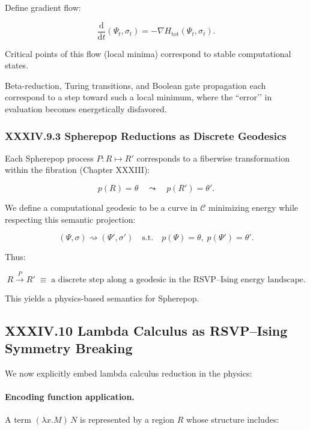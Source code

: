 \documentclass[11pt,letterpaper]{article}
\begin{document}
Define gradient flow:

\[
\frac{\mathrm{d}}{\mathrm{d}t}(\Psi_t,\sigma_t)
= 
- \nabla H_{\text{tot}}(\Psi_t, \sigma_t).
\]

Critical points of this flow (local minima) correspond to stable computational states.

Beta-reduction, Turing transitions, and Boolean gate propagation each correspond to a step toward such a local minimum, where the ``error’’ in evaluation becomes energetically disfavored.

\subsubsection{XXXIV.9.3 Spherepop Reductions as Discrete Geodesics}

Each Spherepop process $P : R \mapsto R'$ corresponds to a fiberwise transformation within the fibration (Chapter XXXIII):

\[
p(R) = \theta
\quad\leadsto\quad
p(R') = \theta'.
\]

We define a computational geodesic to be a curve in $\mathcal{C}$ minimizing energy while respecting this semantic projection:

\[
(\Psi,\sigma) \rightsquigarrow (\Psi',\sigma')
\quad\text{s.t.}\quad
p(\Psi) = \theta,\; p(\Psi') = \theta'.
\]

Thus:

\[
\boxed{
R \xrightarrow{P} R'
\;\equiv\;
\text{a discrete step along a geodesic in the RSVP--Ising energy landscape.}
}
\]

This yields a physics-based semantics for Spherepop.

\subsection{XXXIV.10 Lambda Calculus as RSVP–Ising Symmetry Breaking}

We now explicitly embed lambda calculus reduction in the physics:

\paragraph{Encoding function application.}
A term $(\lambda x.M)\,N$ is represented by a region $R$ whose structure includes:
\end{document}
